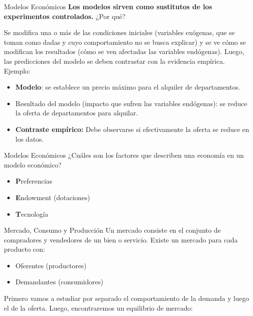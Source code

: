 \documentclass{beamer}
\begin{document}
\begin{frame}{Modelos Económicos}
    \textbf{Los modelos sirven como sustitutos de los experimentos controlados.} ¿Por qué?
    
    Se modifica una o más de las condiciones iniciales (variables exógenas, que se toman como dadas y cuyo comportamiento no se busca explicar) y se ve cómo se modifican los resultados (cómo se ven afectadas las variables endógenas). Luego, las predicciones del modelo se deben contrastar con la evidencia empírica. Ejemplo: 
    
    \begin{itemize}
        \item \textbf{Modelo}: se establece un precio máximo para el alquiler de departamentos. 
        \item Resultado del modelo (impacto que sufren las variables endógenas): se reduce la oferta de departamentos para alquilar.
        \item \textbf{Contraste empírico:} Debe observarse si efectivamente la oferta se reduce en los datos.
    \end{itemize}
\end{frame}

\begin{frame}{Modelos Económicos}
    ¿Cuáles son los factores que describen una economía en un modelo económico?
    \begin{itemize}
    \item \textbf{P}referencias
    \item \textbf{E}ndowment (dotaciones)
    \item \textbf{T}ecnología
    \end{itemize}
\end{frame}

\begin{frame}{Mercado, Consumo y Producción}
Un mercado consiste en el conjunto de compradores y vendedores de un bien o servicio. Existe un mercado para cada producto con: 
    \begin{itemize}
    \item Oferentes (productores)
    \item Demandantes (consumidores)
    \end{itemize}

    Primero vamos a estudiar por separado el comportamiento de la demanda y luego el de la oferta. Luego, encontraremos un equilibrio de mercado:
    
    
    
    \bigskip
    
\end{frame}
\end{document}
